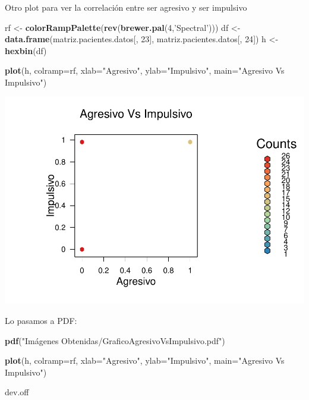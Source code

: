 \documentclass[]{article}
\newenvironment{Shaded}{\begin{snugshade}}{\end{snugshade}}
\newcommand{\KeywordTok}[1]{\textcolor[rgb]{0.13,0.29,0.53}{\textbf{#1}}}
\newcommand{\DataTypeTok}[1]{\textcolor[rgb]{0.13,0.29,0.53}{#1}}
\newcommand{\DecValTok}[1]{\textcolor[rgb]{0.00,0.00,0.81}{#1}}
\newcommand{\StringTok}[1]{\textcolor[rgb]{0.31,0.60,0.02}{#1}}
\newcommand{\NormalTok}[1]{#1}
\begin{document}
Otro plot para ver la correlación entre ser agresivo y ser impulsivo

\begin{Shaded}
\begin{Highlighting}[]
\NormalTok{rf <-}\StringTok{ }\KeywordTok{colorRampPalette}\NormalTok{(}\KeywordTok{rev}\NormalTok{(}\KeywordTok{brewer.pal}\NormalTok{(}\DecValTok{4}\NormalTok{,}\StringTok{'Spectral'}\NormalTok{)))}
\NormalTok{df <-}\StringTok{ }\KeywordTok{data.frame}\NormalTok{(matriz.pacientes.datos[, }\DecValTok{23}\NormalTok{], matriz.pacientes.datos[, }\DecValTok{24}\NormalTok{])}
\NormalTok{h <-}\StringTok{ }\KeywordTok{hexbin}\NormalTok{(df)}

\KeywordTok{plot}\NormalTok{(h, }\DataTypeTok{colramp=}\NormalTok{rf, }\DataTypeTok{xlab=}\StringTok{"Agresivo"}\NormalTok{, }\DataTypeTok{ylab=}\StringTok{"Impulsivo"}\NormalTok{, }\DataTypeTok{main=}\StringTok{"Agresivo Vs Impulsivo"}\NormalTok{)}
\end{Highlighting}
\end{Shaded}

\includegraphics{codigo_files/figure-latex/grafico_agresivo_impulsivo-1.pdf}

Lo pasamos a PDF:

\begin{Shaded}
\begin{Highlighting}[]
\KeywordTok{pdf}\NormalTok{(}\StringTok{"Imágenes Obtenidas/GraficoAgresivoVsImpulsivo.pdf"}\NormalTok{)}

\KeywordTok{plot}\NormalTok{(h, }\DataTypeTok{colramp=}\NormalTok{rf, }\DataTypeTok{xlab=}\StringTok{"Agresivo"}\NormalTok{, }\DataTypeTok{ylab=}\StringTok{"Impulsivo"}\NormalTok{, }\DataTypeTok{main=}\StringTok{"Agresivo Vs Impulsivo"}\NormalTok{)}

\NormalTok{dev.off}
\end{Highlighting}
\end{Shaded}
\end{document}
